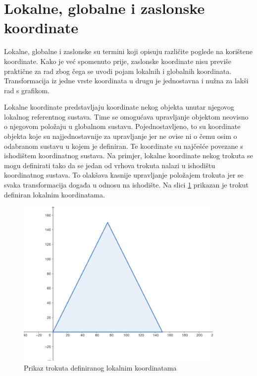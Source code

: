 \documentclass{foi}
\begin{document}
\section{Lokalne, globalne i zaslonske koordinate}

Lokalne, globalne i zaslonske su termini koji opisuju različite poglede na korištene koordinate. Kako je već spomenuto prije, zaslonske koordinate nisu previše praktične za rad zbog čega se uvodi pojam lokalnih i globalnih koordinata. Transformacija iz jedne vrste koordinata u drugu je jednostavna i nužna za lakši rad s grafikom. 

Lokalne koordinate predstavljaju koordinate nekog objekta unutar njegovog lokalnog referentnog sustava. Time se omogućava upravljanje objektom neovisno o njegovom položaju u globalnom sustavu. Pojednostavljeno, to su koordinate objekta koje su najjednostavnije za upravljanje jer ne ovise ni o čemu osim o odabranom sustavu u kojem je definiran. Te koordinate su najčešće povezane s ishodištem koordinatnog sustava. Na primjer, lokalne koordinate nekog trokuta se mogu definirati tako da se jedan od vrhova trokuta nalazi u ishodištu koordinatnog sustava. To olakšava kasnije upravljanje položajem trokuta jer se svaka transformacija događa u odnosu na ishodište. Na slici \ref{fig:LokalneKoordinateTrokut} prikazan je trokut definiran lokalnim koordinatama.
\\
\begin{figure}[H]
    \centering
    \includegraphics[width=0.9\textwidth]{slike/2_LokalneKoordinateTrokut.png}
    \captionsetup{justification=centering}
    \caption{Prikaz trokuta definiranog lokalnim koordinatama}
\label{fig:LokalneKoordinateTrokut}
\end{figure}
\end{document}
